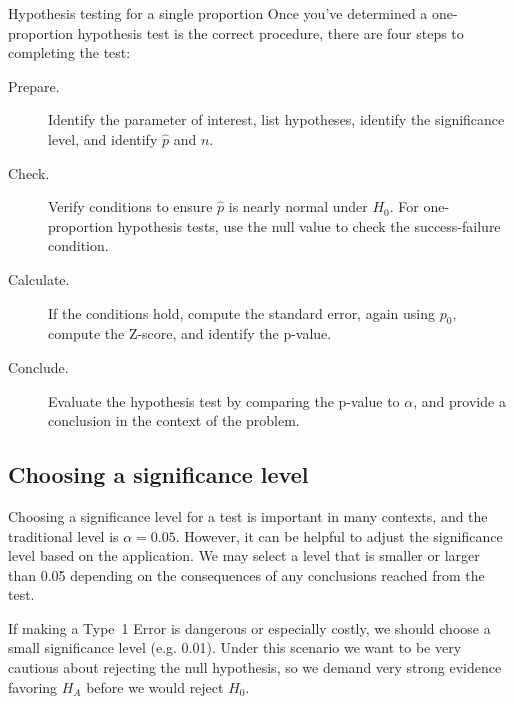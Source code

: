 
\D{\newpage}

\newcommand{\oneprophtsummary}{
\begin{onebox}{Hypothesis testing for a single proportion}
  Once you've determined a one-proportion hypothesis test is the
  correct procedure, there are four steps to completing the
  test:
  \begin{description}
  \item[Prepare.]
      Identify the parameter of interest,
      list hypotheses,
      identify the significance level,
      and identify $\hat{p}$ and $n$.
  \item[Check.]
      Verify conditions
      to ensure $\hat{p}$ is nearly normal under $H_0$.
      For one-proportion hypothesis tests, use the null
      value to check the success-failure condition.
  \item[Calculate.]
      If the conditions hold, compute the standard
      error, again using $p_0$, compute the Z-score,
      and identify the p-value.
  \item[Conclude.]
      Evaluate the hypothesis test by comparing the p-value
      to $\alpha$, and provide a conclusion in the context
      of the problem.
  \end{description}
\end{onebox}
}
\oneprophtsummary{}



\subsection{Choosing a significance level}
\label{significanceLevel}


Choosing a significance level for a test is important in
many contexts, and the traditional level is $\alpha = 0.05$.
However, it can be helpful to adjust the significance level
based on the application. We may select a level that is
smaller or larger than 0.05 depending on the consequences
of any conclusions reached from the test.

If making a Type~1 Error is dangerous or especially costly,
we should choose a small significance level (e.g. 0.01).
Under this scenario we want to be very cautious about
rejecting the null hypothesis, so we demand very strong
evidence favoring $H_A$ before we would reject $H_0$.


